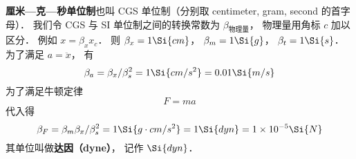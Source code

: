 

\textbf{厘米—克—秒单位制}也叫 CGS 单位制（分别取 centimeter, gram, second 的首字母）． 我们令 CGS 与 SI 单位制之间的转换常数为 $\beta_\text{物理量}$， 物理量用角标 $c$ 加以区分． 例如 $x = \beta_x x_c$． 则 $\beta_x = 1\Si{cm}$， $\beta_m = 1\Si{g}$， $\beta_t = 1\Si{s}$．
为了满足 $a = \ddot x$， 有
\begin{equation}
\beta_a = \beta_x/\beta_s^2 = 1\Si{cm/s^2} = 0.01 \Si{m/s}
\end{equation}
为了满足牛顿定律
\begin{equation}
F = ma
\end{equation}
代入得
\begin{equation}
\beta_F = \beta_m \beta_x/\beta_s^2 = 1\Si{g \cdot cm/s^2} = 1\Si{dyn} = 1\times 10^{-5} \Si{N}
\end{equation}
其单位叫做\textbf{达因（dyne）}， 记作 $\Si{dyn}$．
